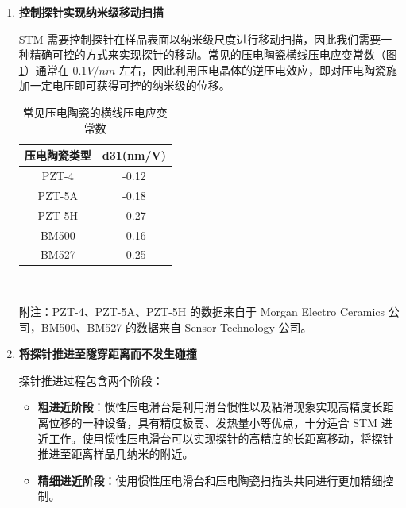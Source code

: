 \documentclass[zihao=-4]{ctexart}
\begin{document}
\begin{spacing}{1.5}
\begin{enumerate}
		
		
		
		\item \textbf{控制探针实现纳米级移动扫描}\par
		\qquad STM 需要控制探针在样品表面以纳米级尺度进行移动扫描，因此我们需要一种精确可控的方式来实现探针的移动。常见的压电陶瓷横线压电应变常数（图 \ref{tab1}）通常在 $0.1V/nm$ 左右，因此利用压电晶体的逆压电效应，即对压电陶瓷施加一定电压即可获得可控的纳米级的位移。
		
		\begin{table}[H]
			\small
			\caption{常见压电陶瓷的横线压电应变常数}
			\centering
			\begin{tabular}{cc}
					\toprule
					\qquad\textbf{压电陶瓷类型}\qquad\qquad &\qquad \textbf{d31(nm/V)} \qquad\qquad  \\ 
					\midrule
					PZT-4	&	-0.12	\\  
					PZT-5A 	& 	-0.18	\\
					PZT-5H 	& 	-0.27	\\
					BM500 	&	-0.16	\\
					BM527	&	-0.25	\\
					\bottomrule
				\end{tabular}\\\vskip 1mm
				\begin{minipage}{0.5\linewidth}
					附注：PZT-4、PZT-5A、PZT-5H 的数据来自于 Morgan Electro Ceramics 公司，BM500、BM527 的数据来自 Sensor Technology 公司。 
				\end{minipage}
				\label{tab1}
			\end{table}
		
		
		
	
		
		\item \textbf{将探针推进至隧穿距离而不发生碰撞}\par
		探针推进过程包含两个阶段：
		\begin{itemize}
			\item \textbf{粗进近阶段}：惯性压电滑台是利用滑台惯性以及粘滑现象实现高精度长距离位移的一种设备，具有精度极高、发热量小等优点，十分适合 STM 进近工作。使用惯性压电滑台可以实现探针的高精度的长距离移动，将探针推进至距离样品几纳米的附近。

			\item \textbf{精细进近阶段}：使用惯性压电滑台和压电陶瓷扫描头共同进行更加精细控制。

		\end{itemize}
		
		
		


\end{enumerate}
\end{spacing}
\end{document}
